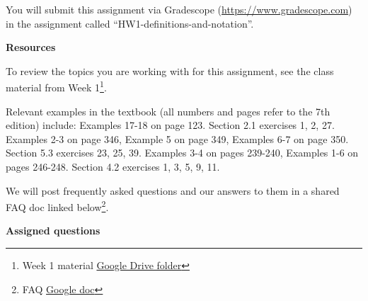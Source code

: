 \documentclass[12pt, oneside]{article}
\begin{document}
You will submit this assignment via Gradescope
(\href{https://www.gradescope.com}{https://www.gradescope.com}) in the assignment called ``HW1-definitions-and-notation''.


{\bf Resources}

To review the topics you are working with for this assignment, see the class material from 
Week 1\footnote{Week 1 material \href{https://drive.google.com/drive/folders/1ldVPHpuoxXIwIIy-tJ4flm-w9L6vjlC_?usp=sharing}
{Google Drive folder}}.

Relevant examples in the textbook (all numbers and pages refer to the 7th edition) include: 
Examples 17-18 on page 123. Section 2.1 exercises 1, 2, 27. Examples 2-3 on page 346, Example 5 on page 349, Examples 6-7 on page 350. Section 5.3 exercises 23, 25, 39. Examples 3-4 on pages 239-240, Examples 1-6 on pages 246-248. Section 4.2 exercises 1, 3, 5, 9, 11.

We will post frequently asked questions and our answers to them in a 
shared FAQ doc linked below\footnote{FAQ \href{https://docs.google.com/document/d/1UompYSqscNBDO43VKvcO17HCwLJGP6d7XRa_poit4Cc}{Google doc}}.

{\bf Assigned questions}
\end{document}
